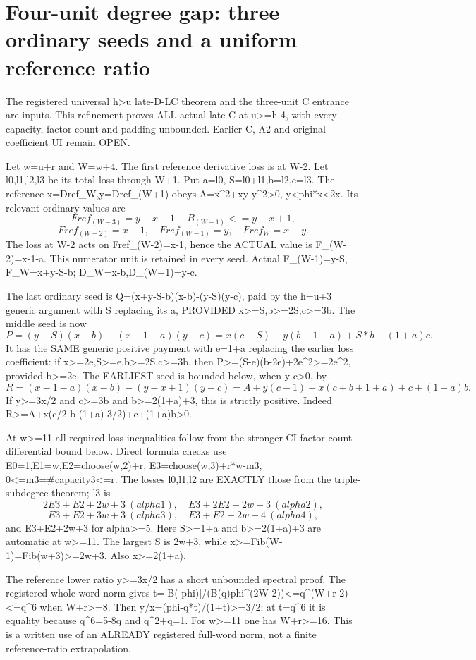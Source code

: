 \section{Four-unit degree gap: three ordinary seeds and a uniform reference ratio}
The registered universal h>u late-D-LC theorem and the three-unit
C entrance are inputs. This refinement proves ALL actual late C
at u>=h-4, with every capacity, factor count and padding unbounded.
Earlier C, A2 and original coefficient UI remain OPEN.

Let w=u+r and W=w+4. The first reference derivative loss is at W-2.
Let l0,l1,l2,l3 be its total loss through W+1. Put a=l0,
S=l0+l1,b=l2,c=l3. The reference x=Dref_W,y=Dref_(W+1) obeys
A=x^2+xy-y^2>0, y<phi*x<2x. Its relevant ordinary values are
\[
 Fref_(W-3)=y-x+1-B_(W-1)<=y-x+1,
\]
\[
 Fref_(W-2)=x-1,\quad Fref_(W-1)=y,\quad Fref_W=x+y.
\]
The loss at W-2 acts on Fref_(W-2)=x-1, hence the ACTUAL
value is F_(W-2)=x-1-a. This numerator unit is retained in every seed.
Actual F_(W-1)=y-S, F_W=x+y-S-b; D_W=x-b,D_(W+1)=y-c.

The last ordinary seed is
Q=(x+y-S-b)(x-b)-(y-S)(y-c), paid by the h=u+3 generic
argument with S replacing its a, PROVIDED x>=S,b>=2S,c>=3b.
The middle seed is now
\[
 P=(y-S)(x-b)-(x-1-a)(y-c)
   =x(c-S)-y(b-1-a)+S*b-(1+a)c.
\]
It has the SAME generic positive payment with e=1+a replacing
the earlier loss coefficient: if x>=2e,S>=e,b>=2S,c>=3b,
then P>=(S-e)(b-2e)+2e^2>=2e^2, provided b>=2e.
The EARLIEST seed is bounded below, when y-c>0, by
\[
 R=(x-1-a)(x-b)-(y-x+1)(y-c)
 =A+y(c-1)-x(c+b+1+a)+c+(1+a)b.
\]
If y>=3x/2 and c>=3b and b>=2(1+a)+3, this is strictly positive.
Indeed R>=A+x(c/2-b-(1+a)-3/2)+c+(1+a)b>0.

At w>=11 all required loss inequalities follow from the stronger
CI-factor-count differential bound below. Direct formula checks use
E0=1,E1=w,E2=choose(w,2)+r,
E3=choose(w,3)+r*w-m3, 0<=m3=#capacity3<=r.
The losses l0,l1,l2 are EXACTLY those from the triple-subdegree
theorem; l3 is
\[
 2E3+E2+2w+3\ (alpha1),\quad E3+2E2+2w+3\ (alpha2),
\]
\[
 E3+E2+3w+3\ (alpha3),\quad E3+E2+2w+4\ (alpha4),
\]
and E3+E2+2w+3 for alpha>=5. Here S>=1+a and b>=2(1+a)+3
are automatic at w>=11. The largest S is 2w+3, while
x>=Fib(W-1)=Fib(w+3)>=2w+3. Also x>=2(1+a).

The reference lower ratio y>=3x/2 has a short
unbounded spectral proof. The registered whole-word norm gives
t=|B(-phi)|/(B(q)phi^(2W-2))<=q^(W+r-2)<=q^6 when W+r>=8.
Then y/x=(phi-q*t)/(1+t)>=3/2; at t=q^6 it is equality because
q^6=5-8q and q^2+q=1. For w>=11 one has W+r>=16.
This is a written use of an ALREADY registered full-word norm,
not a finite reference-ratio extrapolation.

